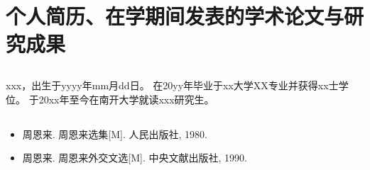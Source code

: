 

\cleardoublepage
{}
\chapter*{个人简历、在学期间发表的学术论文与研究成果}

\section*{}

{
\zihaowu
\setlength{\baselineskip}{16pt}
\setlength{\parskip}{0pt}

xxx，出生于yyyy年mm月dd日。
在20yy年毕业于xx大学XX专业并获得xx士学位。
于20xx年至今在南开大学就读xxx研究生。

}

\section*{}


{
\zihaowu
\setlength{\baselineskip}{16pt}
\setlength{\parskip}{0pt}

\begin{itemize}
	\item 周恩来. 周恩来选集[M]. 人民出版社, 1980.
	\item 周恩来. 周恩来外交文选[M]. 中央文献出版社, 1990.
\end{itemize}

}






